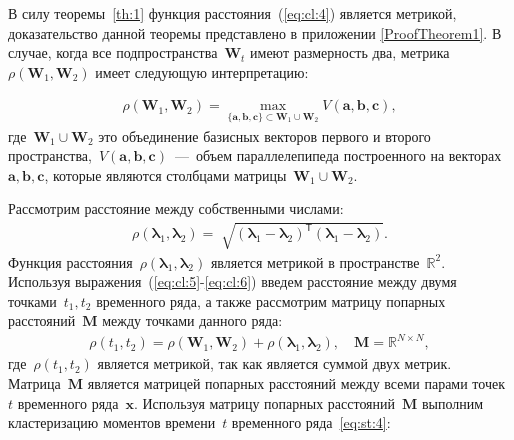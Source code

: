 \documentclass[12pt, twoside]{article}
\numberwithin{equation}{section}
\begin{document}
В силу теоремы~\ref{th:1} функция расстояния~(\ref{eq:cl:4}) является метрикой, доказательство данной теоремы представлено в приложении \ref{ProofTheorem1}. В случае, когда все подпространства~$\textbf{W}_t$ имеют размерность два, метрика~$\rho\left(\textbf{W}_1, \textbf{W}_2\right)$ имеет следующую интерпретацию:

\begin{equation}
\label{eq:cl:5}
\begin{aligned}
\rho\left(\textbf{W}_1, \textbf{W}_2\right) = \max_{\{\textbf{a},\textbf{b},\textbf{c}\} \subset \textbf{W}_1\cup \textbf{W}_2 } V\left(\textbf{a},\textbf{b},\textbf{c}\right), 
\end{aligned}
\end{equation}
где~$\textbf{W}_1\cup\textbf{W}_2$ это объединение базисных векторов первого и второго пространства,~$V\left(\textbf{a},\textbf{b},\textbf{c}\right)$~---~объем параллелепипеда построенного на векторах~$\textbf{a}, \textbf{b}, \textbf{c}$, которые являются столбцами матрицы~$\textbf{W}_1\cup\textbf{W}_2$.


Рассмотрим расстояние между собственными числами:
\begin{equation}
\label{eq:cl:6}
\begin{aligned}
\rho\left(\bm{\lambda}_1, \bm{\lambda}_2\right) = \sqrt[]{\left(\bm{\lambda}_1 - \bm{\lambda}_2\right)^{\mathsf{T}}\left(\bm{\lambda}_1 - \bm{\lambda}_2\right)}.
\end{aligned}
\end{equation}
Функция расстояния~$\rho\left(\bm{\lambda}_1, \bm{\lambda}_2\right)$ является метрикой в пространстве~$\mathbb{R}^2$.
Используя выражения~(\ref{eq:cl:5}-\ref{eq:cl:6}) введем расстояние между двумя точками~$t_1, t_2$ временного ряда, а также рассмотрим матрицу попарных расстояний~$\textbf{M}$ между точками данного ряда:
\begin{equation}
\label{eq:cl:9}
\begin{aligned}
\rho\left(t_1, t_2\right) = \rho\left(\textbf{W}_1, \textbf{W}_2\right) + \rho\left(\bm{\lambda}_1, \bm{\lambda}_2\right), \quad \textbf{M} =  \mathbb{R}^{N\times N},
\end{aligned}
\end{equation}
где~$\rho\left(t_1, t_2\right)$ является метрикой, так как является суммой двух метрик. Матрица~$\textbf{M}$ является матрицей попарных расстояний между всеми парами точек~$t$ временного ряда~$\textbf{x}$.
Используя матрицу попарных расстояний~$\textbf{M}$ выполним кластеризацию моментов времени~$t$ временного ряда~\eqref{eq:st:4}:
\end{document}
